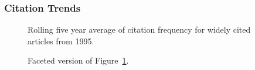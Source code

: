 \documentclass[
  10pt,
  letterpaper,
  DIV=11,
  numbers=noendperiod,
  twoside]{scrartcl}
\begin{document}
\subsubsection*{Citation Trends}\label{citation-trends-19}

\begin{figure}


\caption{\label{fig-citation-spaghetti-1995}Rolling five year average of
citation frequency for widely cited articles from 1995.}

\end{figure}%

\begin{figure}


\caption{\label{fig-citation-facet-1995}Faceted version of
Figure~\ref{fig-citation-spaghetti-1995}.}

\end{figure}%
\end{document}
